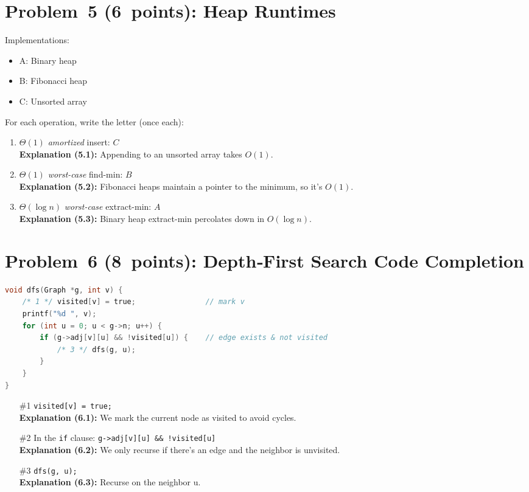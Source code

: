\documentclass[12pt]{article}
\begin{document}
\section*{Problem 5 (6 points): Heap Runtimes}
Implementations:
\begin{itemize}
  \item A: Binary heap
  \item B: Fibonacci heap
  \item C: Unsorted array
\end{itemize}
For each operation, write the letter (once each):
\begin{enumerate}[label=\arabic*.]
  \item \(\Theta(1)\) \emph{amortized} insert: \(\boxed{C}\)  
    \\ \textbf{Explanation (5.1):} Appending to an unsorted array takes \(O(1)\).
  \item \(\Theta(1)\) \emph{worst-case} find-min: \(\boxed{B}\)  
    \\ \textbf{Explanation (5.2):} Fibonacci heaps maintain a pointer to the minimum, so it’s \(O(1)\).
  \item \(\Theta(\log n)\) \emph{worst-case} extract-min: \(\boxed{A}\)  
    \\ \textbf{Explanation (5.3):} Binary heap extract-min percolates down in \(O(\log n)\).
\end{enumerate}

\newpage

\section*{Problem 6 (8 points): Depth‑First Search Code Completion}
\begin{lstlisting}[language=C]
void dfs(Graph *g, int v) {
    /* 1 */ visited[v] = true;                // mark v
    printf("%d ", v);
    for (int u = 0; u < g->n; u++) {
        if (g->adj[v][u] && !visited[u]) {    // edge exists & not visited
            /* 3 */ dfs(g, u);
        }
    }
}
\end{lstlisting}
\begin{itemize}
  \item[\#1] \verb|visited[v] = true;|  
    \\ \textbf{Explanation (6.1):} We mark the current node as visited to avoid cycles.
  \item[\#2] In the \verb|if| clause: \verb|g->adj[v][u] && !visited[u]|  
    \\ \textbf{Explanation (6.2):} We only recurse if there’s an edge and the neighbor is unvisited.
  \item[\#3] \verb|dfs(g, u);|  
    \\ \textbf{Explanation (6.3):} Recurse on the neighbor u.
\end{itemize}
\end{document}
